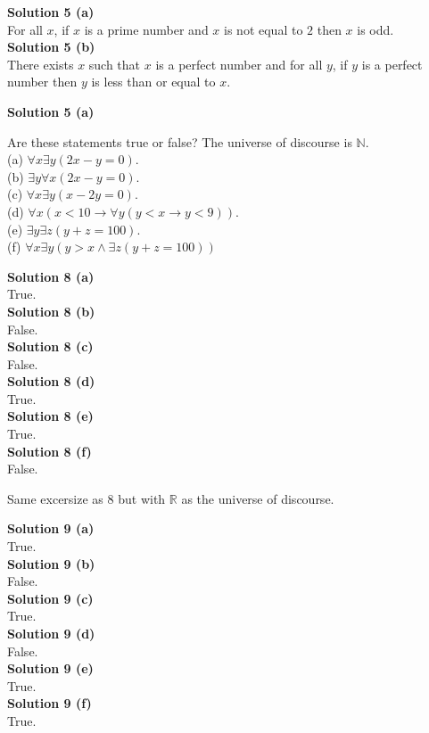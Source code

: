 \textbf{Solution 5 (a)} \\
For all $x$, if $x$ is a prime number and $x$ is not equal to $2$ then
$x$ is odd. \\
\textbf{Solution 5 (b)} \\
There exists $x$ such that $x$ is a perfect number and
for all $y$, if $y$ is a perfect number then $y$ is less than 
or equal to $x$.

\textbf{Solution 5 (a)}

\begin{tcolorbox}[title=Problem 8, breakable]
Are these statements true or false? The universe of discourse is $\mathbb{N}$. \\
(a) $\forall{x}\exists{y}(2x - y = 0)$. \\
(b) $\exists{y}\forall{x}(2x - y = 0)$. \\
(c) $\forall{x}\exists{y}(x - 2y = 0)$. \\
(d) $\forall{x}(x < 10 \rightarrow \forall{y}(y < x \rightarrow y < 9))$. \\
(e) $\exists{y}\exists{z}(y + z = 100)$. \\
(f) $\forall{x}\exists{y}(y > x \wedge \exists{z}(y + z = 100))$
\end{tcolorbox}

\textbf{Solution 8 (a)} \\
True. \\
\textbf{Solution 8 (b)} \\
False. \\
\textbf{Solution 8 (c)} \\
False. \\
\textbf{Solution 8 (d)} \\
True. \\
\textbf{Solution 8 (e)} \\
True. \\
\textbf{Solution 8 (f)} \\
False.

\begin{tcolorbox}[title=Problem 9, breakable]
Same excersize as $8$ but with $\mathbb{R}$ as the universe of discourse.
\end{tcolorbox}

\textbf{Solution 9 (a)} \\
True. \\
\textbf{Solution 9 (b)} \\
False. \\
\textbf{Solution 9 (c)} \\
True. \\
\textbf{Solution 9 (d)} \\
False. \\
\textbf{Solution 9 (e)} \\
True. \\
\textbf{Solution 9 (f)} \\
True. 


